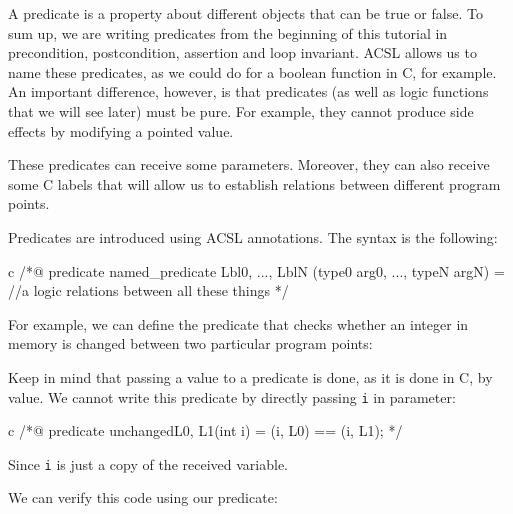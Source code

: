 A predicate is a property about different objects that can be true or
false. To sum up, we are writing predicates from the beginning of this
tutorial in precondition, postcondition, assertion and loop invariant.
ACSL allows us to name these predicates, as we could do for a boolean
function in C, for example. An important difference, however, is that
predicates (as well as logic functions that we will see later) must be pure.
For example, they cannot produce side effects by modifying a pointed
value.

These predicates can receive some parameters. Moreover, they can also
receive some C labels that will allow us to establish relations between
different program points.





Predicates are introduced using ACSL annotations. The syntax is the
following:



\begin{CodeBlock}{c}
/*@
  predicate named_predicate { Lbl0, ..., LblN }(type0 arg0, ..., typeN argN) =
    //a logic relations between all these things
*/
\end{CodeBlock}



For example, we can define the predicate that checks whether an integer
in memory is changed between two particular program points:






\begin{Warning}
  Keep in mind that passing a value to a predicate is done, as it is done in C,
  by value. We cannot write this predicate by directly passing \texttt{i} in
  parameter:

\begin{CodeBlock}{c}
/*@
  predicate unchanged{L0, L1}(int i) =
    \at(i, L0) == \at(i, L1);
 */
\end{CodeBlock}

  Since \texttt{i} is just a copy of the received variable.
\end{Warning}


We can verify this code using our predicate:






